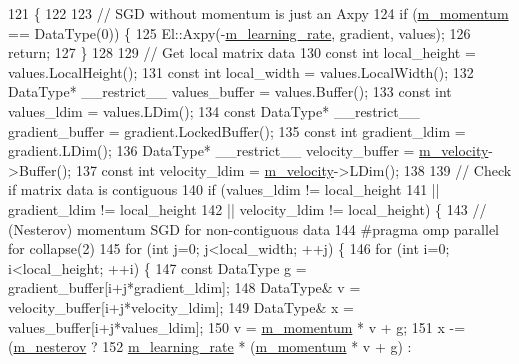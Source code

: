 \begin{DoxyCode}
121                                                                      \{
122 
123   \textcolor{comment}{// SGD without momentum is just an Axpy}
124   \textcolor{keywordflow}{if} (\hyperlink{classlbann_1_1sgd_a2e56d66d350debcf0d2c3ad76c214074}{m\_momentum} == DataType(0)) \{
125     El::Axpy(-\hyperlink{classlbann_1_1optimizer_ad393dcdcb82b44510c586ed5ec46d4dd}{m\_learning\_rate}, gradient, values);
126     \textcolor{keywordflow}{return};
127   \}
128   
129   \textcolor{comment}{// Get local matrix data}
130   \textcolor{keyword}{const} \textcolor{keywordtype}{int} local\_height = values.LocalHeight();
131   \textcolor{keyword}{const} \textcolor{keywordtype}{int} local\_width = values.LocalWidth();
132   DataType* \_\_restrict\_\_ values\_buffer = values.Buffer();
133   \textcolor{keyword}{const} \textcolor{keywordtype}{int} values\_ldim = values.LDim();
134   \textcolor{keyword}{const} DataType* \_\_restrict\_\_ gradient\_buffer = gradient.LockedBuffer();
135   \textcolor{keyword}{const} \textcolor{keywordtype}{int} gradient\_ldim = gradient.LDim();
136   DataType* \_\_restrict\_\_ velocity\_buffer = \hyperlink{classlbann_1_1sgd_a27f2d893014cef8357edffb63bf649f0}{m\_velocity}->Buffer();
137   \textcolor{keyword}{const} \textcolor{keywordtype}{int} velocity\_ldim = \hyperlink{classlbann_1_1sgd_a27f2d893014cef8357edffb63bf649f0}{m\_velocity}->LDim();
138   
139   \textcolor{comment}{// Check if matrix data is contiguous}
140   \textcolor{keywordflow}{if} (values\_ldim != local\_height
141       || gradient\_ldim != local\_height
142       || velocity\_ldim != local\_height) \{
143     \textcolor{comment}{// (Nesterov) momentum SGD for non-contiguous data}
144 \textcolor{preprocessor}{    #pragma omp parallel for collapse(2)}
145     \textcolor{keywordflow}{for} (\textcolor{keywordtype}{int} j=0; j<local\_width; ++j) \{
146       \textcolor{keywordflow}{for} (\textcolor{keywordtype}{int} i=0; i<local\_height; ++i) \{
147         \textcolor{keyword}{const} DataType g = gradient\_buffer[i+j*gradient\_ldim];
148         DataType& v = velocity\_buffer[i+j*velocity\_ldim];
149         DataType& x = values\_buffer[i+j*values\_ldim];
150         v = \hyperlink{classlbann_1_1sgd_a2e56d66d350debcf0d2c3ad76c214074}{m\_momentum} * v + g;
151         x -= (\hyperlink{classlbann_1_1sgd_a82da488e5d1530f50f67cd4ea30909cb}{m\_nesterov} ?
152               \hyperlink{classlbann_1_1optimizer_ad393dcdcb82b44510c586ed5ec46d4dd}{m\_learning\_rate} * (\hyperlink{classlbann_1_1sgd_a2e56d66d350debcf0d2c3ad76c214074}{m\_momentum} * v + g) :

\end{DoxyCode}
